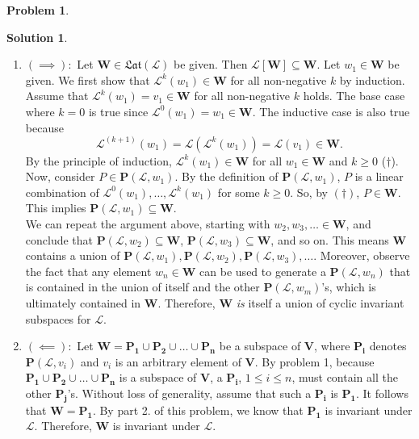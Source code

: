 \documentclass{article}
\theoremstyle{definition}
\newtheorem*{prob*}{Problem}
\newtheorem*{sln*}{Solution}
\newcommand{\V}{\mathbf{V}}
\newcommand{\W}{\mathbf{W}}
\newcommand{\lag}{\mathcal{L}}
\begin{document}
\begin{prob*}
\begin{sln*}
\begin{enumerate}
\begin{enumerate}
			\item $(\implies):$ Let $\W \in \mathfrak{Lat}(\lag)$ be given. Then $\lag[\W] \subseteq \W$. Let $w_1 \in \W$ be given. We first show that $\lag^k(w_1) \in \W$ for all non-negative $k$ by induction. Assume that $\lag^k(w_1) = v_1 \in \W$ for all non-negative $k$ holds. The base case where $k=0$ is true since $\lag^0(w_1) = w_1\in\W$. The inductive case is also true because $$\lag^{(k+1)}(w_1) = \lag(\lag^k(w_1)) = \lag(v_1) \in \W.$$ By the principle of induction, $\lag^k(w_1) \in \W$ for all $w_1\in\W$ and $k\geq 0$ ($\dagger$). Now, consider $P \in \mathbf{P}(\lag,w_1)$. By the definition of $\mathbf{P}(\lag,w_1)$, $P$ is a linear combination of $\lag^0(w_1),\dots,\lag^k(w_1)$ for some $k\geq 0$. So, by $(\dagger)$, $P \in \W$. This implies $\mathbf{P}(\lag,w_1) \subseteq \W$. \\
			
			We can repeat the argument above, starting with $w_2,w_3,\dots \in \W$, and conclude that $\mathbf{P}(\lag,w_2) \subseteq \W$, $\mathbf{P}(\lag,w_3) \subseteq \W$, and so on. This means $\W$ contains a union of $\mathbf{P}(\lag,w_1), \mathbf{P}(\lag,w_2), \mathbf{P}(\lag,w_3), \dots$. Moreover, observe the fact that any element $w_n \in \W$ can be used to generate a $\mathbf{P}(\lag,w_n)$ that is contained in the union of itself and the other $\mathbf{P}(\lag,w_m)$'s, which is ultimately contained in $\W$. Therefore, $\W$ \textit{is} itself a union of cyclic invariant subspaces for $\lag$.\\  
			
			
			\item $(\impliedby):$ Let $\W = \mathbf{P_1} \cup \mathbf{P_2} \cup \dots \cup \mathbf{P_n}$ be a subspace of $\V$, where $\mathbf{P_i}$ denotes $\mathbf{P}(\lag,v_i)$ and $v_i$ is an arbitrary element of $\V$. By problem 1, because $\mathbf{P_1} \cup \mathbf{P_2} \cup \dots \cup \mathbf{P_n}$ is a subspace of $\V$, a $\mathbf{P_i}$, $1\leq i \leq n$, must contain all the other $\mathbf{P_j}$'s. Without loss of generality, assume that such a $\mathbf{P_i}$ is $\mathbf{P_1}$. It follows that $\W = \mathbf{P_1}$. By part 2. of this problem, we know that $\mathbf{P_1}$ is invariant under $\lag$. Therefore, $\W$ is invariant under $\lag$.
			
			 
			\end{enumerate} 
			
		\end{enumerate}
	\end{sln*}
\end{prob*}
\end{document}
